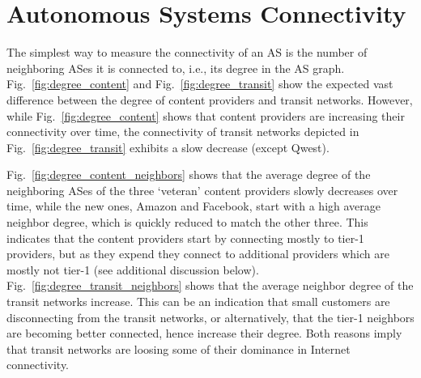 \documentclass[conference]{IEEEtran}
\newcommand{\ignore}[1]{}
\newcommand{\figref}[1]{Fig.~\ref{#1}}
\newcommand{\figsize}{0.45}
\begin{document}
\section{Autonomous Systems Connectivity}


The simplest way to measure the connectivity of an AS is the number of neighboring ASes it is connected to, i.e., its degree
in the AS graph. \figref{fig:degree_content} and
\figref{fig:degree_transit}
show the expected vast difference between the degree of content providers and transit networks.
However, while \figref{fig:degree_content} shows that content providers are increasing their connectivity over
time, the connectivity of transit networks depicted in \figref{fig:degree_transit} exhibits a slow decrease (except Qwest).

\figref{fig:degree_content_neighbors} shows that the average degree of the neighboring ASes of the
three `veteran' content
providers slowly decreases over time, while the new ones, Amazon and Facebook, start with a high average neighbor degree, which is quickly
reduced to match the other three. This indicates that the content providers start by connecting mostly to tier-1
providers, but as they expend they connect to additional providers which are mostly not tier-1 (see additional discussion below).
\figref{fig:degree_transit_neighbors} shows that the average neighbor degree of the transit networks increase. This
can be an indication that small customers are disconnecting from the transit networks, or alternatively, that the tier-1
neighbors are becoming better connected, hence increase their degree. Both reasons imply that transit networks
are loosing some of their dominance in Internet connectivity.


\ignore{
\begin{figure*}[tbh]
\centering
    \subfloat[Content]{
	\label{fig:degree_content}
    \epsfig{file=fig/content_iplane_degree,width=\figsize\textwidth}
    }
\subfloat[Content neighbors]{
	\label{fig:degree_content_neighbors}
    \epsfig{file=fig/content_iplane_degree_neighbors,width=\figsize\textwidth}
    }
    \hspace{-1mm}
    \subfloat[Transit]{
    \label{fig:degree_transit}
    \epsfig{file=fig/transit_iplane_degree,width=\figsize\textwidth}
    }
\subfloat[Transit neighbors]{
    \label{fig:degree_transit_neighbors}
    \epsfig{file=fig/transit_iplane_degree_neighbors,width=\figsize\textwidth}
    }
    \caption{The degree of transit and content networks, and their average neighbor degree in the AS-graph}
    \label{fig:degree}
\end{figure*}
}
\end{document}
